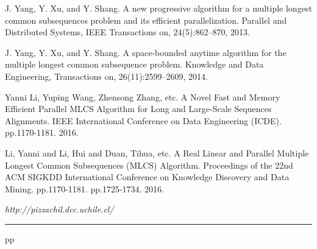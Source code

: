 \documentclass{article}
\begin{document}
\begin{thebibliography}{99}
 J. Yang, Y. Xu, and Y. Shang. A new progressive
  algorithm for a multiple longest common subsequences problem and its
  efficient parallelization. Parallel and Distributed Systems, IEEE
  Transactions on, 24(5):862–870, 2013.

 J. Yang, Y. Xu, and Y. Shang. A space-bounded
  anytime algorithm for the multiple longest common subsequence
  problem. Knowledge and Data Engineering, Transactions on,
  26(11):2599–2609, 2014.

 Yanni Li, Yuping Wang, Zhensong Zhang, etc. A Novel
  Fast and Memory Efficient Parallel MLCS Algorithm for Long and
  Large-Scale Sequences Alignments.  IEEE International Conference on
  Data Engineering (ICDE). pp.1170-1181. 2016.

 Li, Yanni and Li, Hui and Duan, Tihua, etc. A Real Linear
and Parallel Multiple Longest Common Subsequences (MLCS)
Algorithm. Proceedings of the 22nd ACM SIGKDD International Conference
on Knowledge Discovery and Data
Mining. pp.1170-1181. pp.1725-1734. 2016.




 {\it http://pizzachil.dcc.uchile.cl/}

\end{thebibliography}  


\vspace*{-0.01in}
\noindent
\rule{12.6cm}{.1mm}
pp
\end{document}
